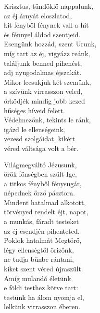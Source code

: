 \documentclass{article}
\begin{document}
\begin{hymnstanzas}
  Krisztus, tündöklő nappalunk, \\
  az éj árnyát eloszlatod, \\
  kit fényből fénynek vall a hit \\
  és fénnyel áldod szentjeid. \\
\stanzabreak
  Esengünk hozzád, szent Urunk, \\
  míg tart az éj, vigyázz reánk, \\
  találjunk benned pihenést, \\
  adj nyugodalmas éjszakát. \\
\stanzabreak
  Mikor lecsukjuk két szemünk, \\
  a szívünk virrasszon veled, \\
  őrködjék mindig jobb kezed \\
  hűséges híveid felett. \\
\stanzabreak
  Védelmezőnk, tekints le ránk, \\
  igázd le ellenségeink, \\
  vezesd szolgáidat, kikért \\
  véred váltsága volt a bér. \\
\end{hymnstanzas}


\begin{hymnstanzas}
  Világmegváltó Jézusunk, \\
  örök fönségben szült Ige, \\
  a titkos fényből fénysugár, \\
  népednek őrző pásztora. \\
\stanzabreak
  Mindent hatalmad alkotott, \\
  törvényed rendelt éjt, napot, \\
  a munkás, fáradt testeket \\
  az éj csendjén pihenteted. \\
\stanzabreak
  Poklok hatalmát Megtörő, \\
  légy ellenségtől őrizőnk, \\
  ne tudja bűnbe rántani, \\
  kiket szent véred újraszült. \\
\stanzabreak
  Amíg mulandó életünk \\
  e földi testhez kötve tart: \\
  testünk ha álom nyomja el, \\
  lelkünk virrasszon éberen.
\end{hymnstanzas}
\end{document}
